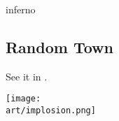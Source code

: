 \begin{multicols*}{2}
\vspace*{2em}
\begin{expansion}{inferno}
  \subsection*{Random Town}
  See it in .
\end{expansion}


\vfill
\hspace{2em}
{\texttt{[image: \\art/implosion.png]}}
\vfill

\end{multicols*}
